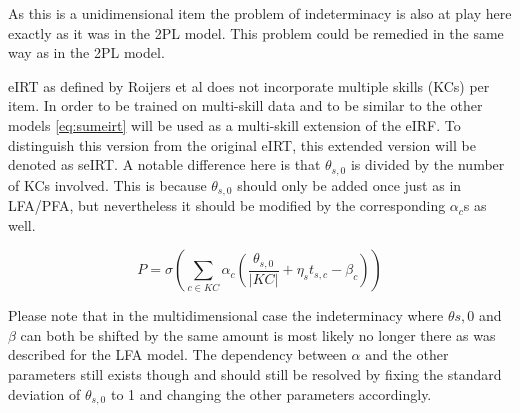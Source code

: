 \documentclass{scrartcl}
\begin{document}
As this is a unidimensional item the problem of indeterminacy is also at play here exactly as it was in the 2PL model. This problem could be remedied in the same way as in the 2PL model.

eIRT as defined by Roijers et al does not incorporate multiple skills (KCs) per item. In order to be trained on multi-skill data and to be similar to the other models \ref{eq:sumeirt} will be used as a multi-skill extension of the eIRF. To distinguish this version from the original eIRT, this extended version will be denoted as seIRT. A notable difference here is that $\theta_{s,0}$ is divided by the number of KCs involved. This is because $\theta_{s,0}$ should only be added once just as in LFA/PFA, but nevertheless it should be modified by the corresponding $\alpha_{c}$s as well.

\begin{equation}
\label{eq:sumeirt}
P = \sigma(\sum_{c \in KC} \alpha_{c}(\frac{\theta_{s,0}}{|KC|} + \eta_{s} t_{s,c} - \beta_{c}))
\end{equation}

Please note that in the multidimensional case the indeterminacy where $\theta{s,0}$ and $\beta$ can both be shifted by the same amount is most likely no longer there as was described for the LFA model. The dependency between $\alpha$ and the other parameters still exists though and should still be resolved by fixing the standard deviation of $\theta_{s,0}$ to 1 and changing the other parameters accordingly.
\end{document}
